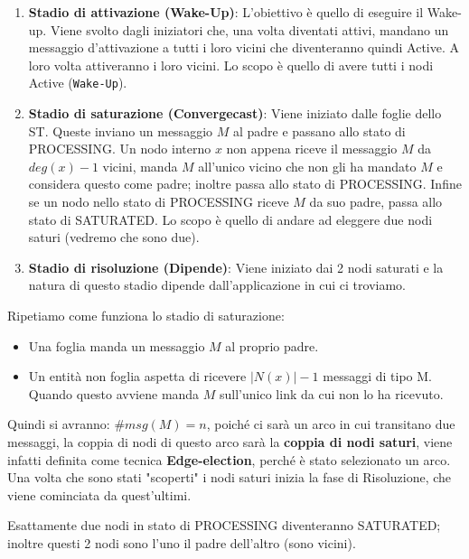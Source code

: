 \begin{enumerate}
    \item \textbf{Stadio di attivazione (Wake-Up)}: L'obiettivo è quello di
          eseguire il Wake-up. Viene svolto dagli iniziatori che, una volta diventati
          attivi, mandano un messaggio d'attivazione a tutti i loro vicini che
          diventeranno quindi Active. A loro volta attiveranno i loro vicini. Lo scopo è
          quello di avere tutti i nodi Active (\texttt{Wake-Up}).
    \item \textbf{Stadio di saturazione (Convergecast)}: Viene iniziato dalle
          foglie dello ST. Queste inviano un messaggio $M$ al padre e passano allo stato
          di PROCESSING. Un nodo interno $x$ non appena riceve il messaggio $M$ da
          $deg(x) -1$ vicini, manda $M$ all'unico vicino che non gli ha mandato $M$ e
          considera questo come padre; inoltre passa allo stato di PROCESSING. Infine se
          un nodo nello stato di PROCESSING riceve $M$ da suo padre, passa allo stato di
          SATURATED. Lo scopo è quello di andare ad eleggere due nodi saturi (vedremo
          che sono due).
    \item \textbf{Stadio di risoluzione (Dipende)}: Viene iniziato dai 2 nodi
          saturati e la natura di questo stadio dipende dall'applicazione in cui
          ci troviamo.
\end{enumerate}
Ripetiamo come funziona lo stadio di saturazione:
\begin{itemize}
    \item Una foglia manda un messaggio $M$ al proprio padre.
    \item Un entità non foglia aspetta di ricevere $|N(x)|-1$ messaggi di tipo M.
          Quando questo avviene manda $M$ sull'unico link da cui non lo ha ricevuto.
\end{itemize}
Quindi si avranno: $\#msg(M) = n$, poiché ci sarà un arco in cui transitano due
messaggi, la coppia di nodi di questo arco sarà la \textbf{coppia di nodi
    saturi}, viene infatti definita come tecnica \textbf{Edge-election}, perché è
stato selezionato un arco. Una volta che sono stati
"scoperti" i nodi saturi inizia la fase di Risoluzione, che viene cominciata da
quest'ultimi.

\begin{theorem}
    Esattamente due nodi in stato di PROCESSING diventeranno SATURATED;
    inoltre questi 2 nodi sono l'uno il padre dell'altro (sono vicini).
\end{theorem}

